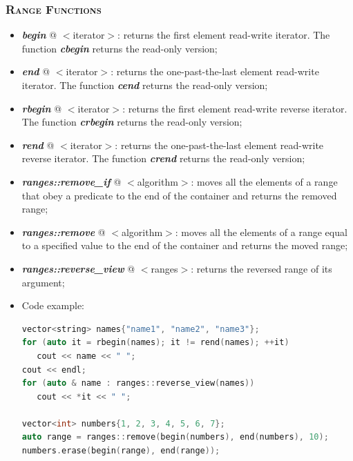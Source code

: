 \documentclass[10pt]{article}
\begin{document}
\begin{multicols*}{4}
{\subsubsection*{\textsc{Range Functions}} 
\begin{itemize}[leftmargin=*,topsep=0.25pt]
  \setlength\itemsep{-1.8pt}
	\item  \emph{\textbf{begin}} @ $<$iterator$>$: returns the first element read-write iterator. The function \emph{\textbf{cbegin}} returns the read-only version;
	\item  \emph{\textbf{end}} @ $<$iterator$>$: returns the one-past-the-last element read-write iterator. The function \emph{\textbf{cend}} returns the read-only version;
	\item  \emph{\textbf{rbegin}} @ $<$iterator$>$: returns the first element read-write reverse iterator. The function \emph{\textbf{crbegin}} returns the read-only version;
 	\item  \emph{\textbf{rend}} @ $<$iterator$>$: returns the one-past-the-last element read-write reverse iterator. The function \emph{\textbf{crend}} returns the read-only version;
	\item  \emph{\textbf{ranges::remove\_if}} @ $<$algorithm$>$: moves all the elements of a range that obey a predicate to the end of the container and returns the removed range; 
	\item  \emph{\textbf{ranges::remove}} @ $<$algorithm$>$: moves all the elements of a range equal to a specified value to the end of the container and returns the moved range;
	\item  \emph{\textbf{ranges::reverse\_view}} @ $<$ranges$>$: returns the reversed range of its argument;
\item Code example:
{\selectfont \lstset{style=mystyle}
 \begin{lstlisting}[language=C++]
vector<string> names{"name1", "name2", "name3"};
for (auto it = rbegin(names); it != rend(names); ++it)
   cout << name << " ";
cout << endl;
for (auto & name : ranges::reverse_view(names))
   cout << *it << " ";

vector<int> numbers{1, 2, 3, 4, 5, 6, 7};
auto range = ranges::remove(begin(numbers), end(numbers), 10);
numbers.erase(begin(range), end(range));
\end{lstlisting}
}

\end{itemize}

}
\end{multicols*}
\end{document}
